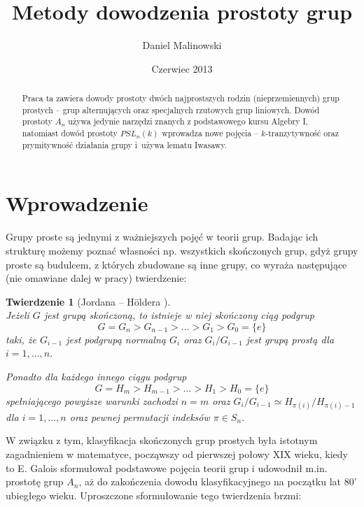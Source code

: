 \documentclass[licencjacka]{pracamgr}
\author{Daniel Malinowski}
\title{Metody dowodzenia prostoty grup}
\date{Czerwiec 2013}
\newtheorem*{thh2}{Twierdzenie}
\begin{document}
\maketitle

\begin{abstract}
  Praca ta zawiera dowody prostoty dwóch najprostszych rodzin (nieprzemiennych) grup prostych --
  grup alternujących oraz specjalnych rzutowych grup liniowych.
  Dowód prostoty $A_n$ używa jedynie narzędzi znanych z podstawowego kursu Algebry I,
  natomiast dowód prostoty $PSL_n(k)$ wprowadza nowe pojęcia -- $k$-tranzytywność
  oraz prymitywność działania grupy i~używa lematu Iwasawy.
\end{abstract}

\tableofcontents


\chapter*{Wprowadzenie}

Grupy proste są jednymi z ważniejszych pojęć w teorii grup.
Badając ich strukturę możemy poznać własności np. wszystkich skończonych grup,
gdyż grupy proste są budulcem, z których zbudowane są inne grupy, co wyraża następujące
(nie omawiane dalej w pracy) twierdzenie:
\begin{thh2}[{Jordana -- H\"oldera  \cite[tw. II.11.9.]{BB}}] $ $ \\
  Jeżeli $G$ jest grupą skończoną, to istnieje w niej skończony ciąg podgrup
    $$ G = G_n > G_{n-1} > \ldots > G_1 > G_0 = \{e\} $$
  taki, że $G_{i-1}$ jest podgrupą normalną $G_{i}$ oraz $G_{i}/G_{i-1}$ jest grupą prostą dla $i = 1, \ldots, n$.

  Ponadto dla każdego innego ciągu podgrup
    $$ G = H_m > H_{m-1} > \ldots > H_1 > H_0 = \{e\} $$
  spełniającego powyższe warunki zachodzi $n = m$ oraz $G_{i}/G_{i-1} \simeq H_{\pi(i)}/H_{\pi(i)-1}$ 
  dla $i = 1, \ldots, n$ oraz pewnej permutacji indeksów $\pi \in S_{n}$.
\end{thh2}

W związku z tym, klasyfikacja skończonych grup prostych była istotnym zagadnieniem w matematyce,
począwszy od pierwszej połowy XIX wieku, kiedy to E. Galois sformułował podstawowe
pojęcia teorii grup i udowodnił m.in. prostotę grup $A_n$, 
aż do zakończenia dowodu klasyfikacyjnego na początku lat 80' ubiegłego wieku.
Uproszczone sformułowanie tego twierdzenia brzmi:
\end{document}
